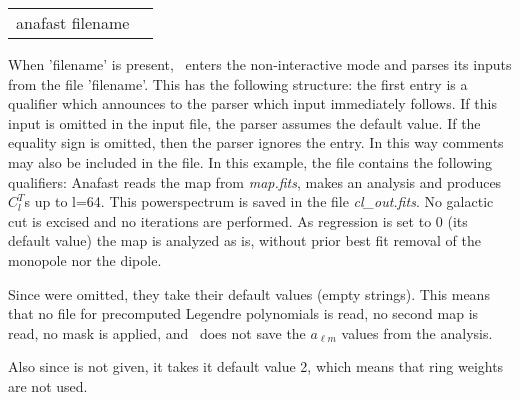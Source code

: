 \begin{examples}{2}
{%
\begin{tabular}{ll} %
anafast  filename \\
\end{tabular}%
}
{When 'filename' is present, \thedocid\ enters the non-interactive mode and parses
its inputs from the file 'filename'. This has the following
structure: the first entry is a qualifier which announces to the parser
which input immediately follows. If this input is omitted in the
input file, the parser assumes the default value.
If the equality sign is omitted, then the parser ignores the entry.
In this way comments may also be included in the file.
In this example, the file contains the following qualifiers:\hfill\newline
{}
Anafast reads the map from {\em map.fits}, makes an analysis and produces $C^T_l$s up to l=64.
This powerspectrum is saved in the file {\em cl\_out.fits}. 
No galactic cut is excised and no iterations are performed.
As regression is set to 0 (its default value) the map is analyzed as
is, without prior best fit removal of the monopole nor the dipole.

Since\hfill\newline
{}
were omitted, they take their default values (empty strings). 
This means that no file for precomputed
Legendre polynomials is read, no second map is read, no mask is applied, and \thedocid\ does not save the $a_{\ell m}$ values
from the analysis.

Also since\hfill\newline
{}
is not given, it takes it default value 2, which means that ring
weights are not used.

}
\end{examples}

